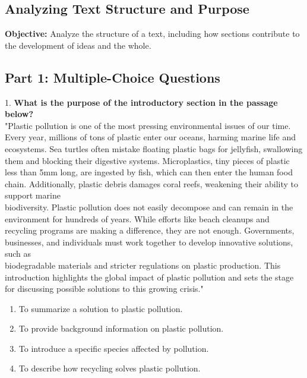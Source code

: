 \documentclass[12pt]{article}
\begin{document}
\subsection*{Analyzing Text Structure and Purpose}
\onehalfspacing

\begin{tcolorbox}[colframe=black!40, colback=gray!0, title=Learning Objective]
\textbf{Objective:} Analyze the structure of a text, including how sections contribute to the development of ideas and the whole.
\end{tcolorbox}

\subsection*{Part 1: Multiple-Choice Questions}

1. \textbf{What is the purpose of the introductory section in the passage below?}\\
"Plastic pollution is one of the most pressing environmental issues of our time. Every year, millions of tons of plastic enter our oceans, harming marine life and ecosystems. Sea turtles often mistake floating plastic bags for jellyfish, swallowing them and blocking their digestive systems. Microplastics, tiny pieces of plastic less than 5mm long, are ingested by fish, which can then enter the human food chain. Additionally, plastic debris damages coral reefs, weakening their ability to support marine \\biodiversity. Plastic pollution does not easily decompose and can remain in the environment for hundreds of years. While efforts like beach cleanups and recycling programs are making a difference, they are not enough. Governments, businesses, and individuals must work together to develop innovative solutions, such as \\biodegradable materials and stricter regulations on plastic production. This \\introduction highlights the global impact of plastic pollution and sets the stage for discussing possible solutions to this growing crisis."\\
\begin{enumerate}[label=\Alph*.]
    \item To summarize a solution to plastic pollution.  
    \item To provide background information on plastic pollution.  
    \item To introduce a specific species affected by pollution.  
    \item To describe how recycling solves plastic pollution.  
\end{enumerate}
\end{document}
